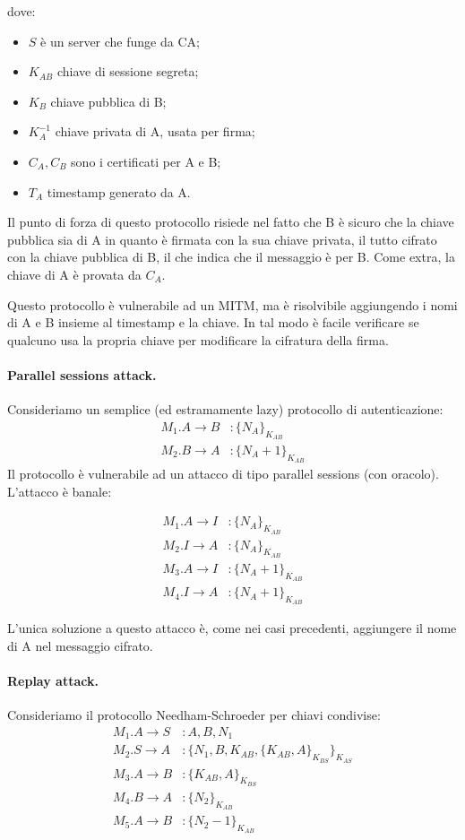 \documentclass[a4paper, 11pt, twoside]{article}
\begin{document}
	dove: \begin{itemize}
		\item $S$ è un server che funge da CA;
		\item $K_{AB}$ chiave di sessione segreta;
		\item $K_B$ chiave pubblica di B;
		\item $K_A^{-1}$ chiave privata di A, usata per firma;
		\item $C_A, C_B$ sono i certificati per A e B;
		\item $T_A$ timestamp generato da A.
	\end{itemize}

	Il punto di forza di questo protocollo risiede nel fatto che B è sicuro che la chiave pubblica sia di A in quanto è firmata con la sua chiave privata, il tutto cifrato con la chiave pubblica di B, il che indica che il messaggio è per B. Come extra, la chiave di A è provata da $C_A$.

	Questo protocollo è vulnerabile ad un MITM, ma è risolvibile aggiungendo i nomi di A e B insieme al timestamp e la chiave. In tal modo è facile verificare se qualcuno usa la propria chiave per modificare la cifratura della firma.

	\paragraph{Parallel sessions attack.} Consideriamo un semplice (ed estramamente lazy) protocollo di autenticazione: \begin{align*}
		M_1. A \to B&: \lbrace N_A\rbrace_{K_{AB}}\\
		M_2. B \to A&: \lbrace N_A + 1 \rbrace_{K_{AB}}
	\end{align*}
	Il protocollo è vulnerabile ad un attacco di tipo parallel sessions (con oracolo).
	L'attacco è banale:

	\begin{align*}
		M_1. A \to I&: \lbrace N_A\rbrace_{K_{AB}}\\
		M_2. I \to A&: \lbrace N_A \rbrace_{K_{AB}}\\
		M_3. A \to I&: \lbrace N_A + 1\rbrace_{K_{AB}}\\
		M_4. I \to A&: \lbrace N_A + 1 \rbrace_{K_{AB}}
	\end{align*}

	L'unica soluzione a questo attacco è, come nei casi precedenti, aggiungere il nome di A nel messaggio cifrato.

	\paragraph{Replay attack.} Consideriamo il protocollo Needham-Schroeder per chiavi condivise: \begin{align*}
		M_1. A \to S&: A, B, N_1 \\
		M_2. S \to A&: \lbrace N_1, B, K_{AB}, \lbrace K_{AB}, A\rbrace_{K_{BS}} \rbrace_{K_{AS}} \\
		M_3. A \to B&: \lbrace K_{AB}, A\rbrace_{K_{BS}} \\
		M_4. B \to A&: \lbrace N_2\rbrace_{K_{AB}}\\
		M_5. A \to B&: \lbrace N_2-1\rbrace_{K_{AB}}
	\end{align*}
\end{document}
